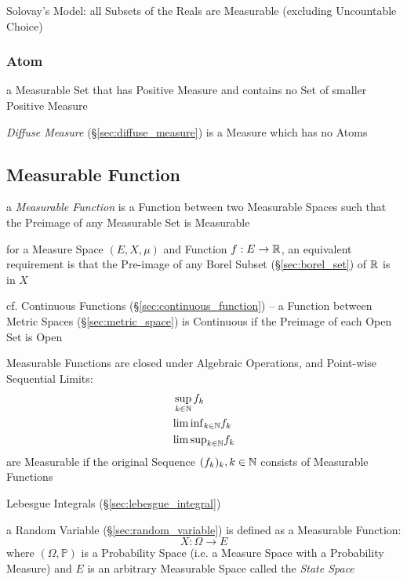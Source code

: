 Solovay's Model: all Subsets of the Reals are Measurable (excluding Uncountable
Choice)



\subsubsection{Atom}\label{sec:atom}

a Measurable Set that has Positive Measure and contains no Set of smaller
Positive Measure

\emph{Diffuse Measure} (\S\ref{sec:diffuse_measure}) is a Measure which has no
Atoms



\subsection{Measurable Function}\label{sec:measurable_function}

a \emph{Measurable Function} is a Function between two Measurable Spaces such
that the Preimage of any Measurable Set is Measurable

for a Measure Space $(E, X, \mu)$ and Function $f : E \rightarrow \mathbb{R}$, an
equivalent requirement is that the Pre-image of any Borel Subset
(\S\ref{sec:borel_set}) of $\mathbb{R}$ is in $X$

\fist cf. Continuous Functions (\S\ref{sec:continuous_function}) -- a Function
between Metric Spaces (\S\ref{sec:metric_space}) is Continuous if the Preimage
of each Open Set is Open

Measurable Functions are closed under Algebraic Operations, and Point-wise
Sequential Limits:
\begin{align*}
  & \sup_{k\in\mathbb{N}} f_k \\
  & {\lim \inf}_{k\in\mathbb{N}} f_k \\
  & {\lim \sup}_{k\in\mathbb{N}} f_k \\
\end{align*}
are Measurable if the original Sequence $(f_k)_k, k \in \mathbb{N}$ consists of
Measurable Functions

\fist Lebesgue Integrals (\S\ref{sec:lebesgue_integral})

a Random Variable (\S\ref{sec:random_variable}) is defined as a Measurable
Function:
\[
  X : \Omega \rightarrow E
\]
where $(\Omega,\mathbb{P})$ is a Probability Space (i.e. a Measure Space with a
Probability Measure) and $E$ is an arbitrary Measurable Space called the
\emph{State Space}

